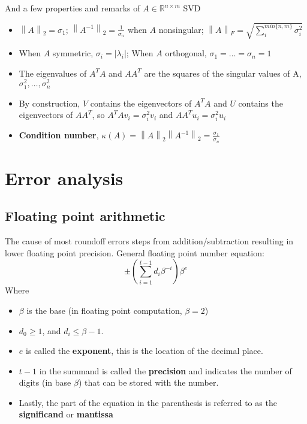 \documentclass{article}
\newcommand{\norm}[2]{\left\lVert#1\right\rVert_#2}
\newcommand{\abs}[1]{\lvert#1\rvert}
\begin{document}
And a few properties and remarks of $A \in \mathbb{R}^{n\times m}$ SVD
\begin{itemize}
    \item $\norm{A}{2} = \sigma_1$; $\norm{A^{-1}}{2} = \frac{1}{\sigma_n}$ when $A$ nonsingular; $\norm{A}{F} = \sqrt{\sum_i^{min\{n,m\}}\sigma_i^2}$
    \item When $A$ symmetric, $\sigma_i = \abs{\lambda_i}$; When $A$ orthogonal, $\sigma_1 = \dots = \sigma_n = 1$
    \item The eigenvalues of $A^TA$ and $AA^T$ are the squares of the singular values of A, $\sigma_1^2, \dots, \sigma_n^2$
    \item By construction, $V$ contains the eigenvectors of $A^TA$ and $U$ contains the eigenvectors of $AA^T$, so $A^TAv_i = \sigma_i^2v_i$ and $AA^Tu_i = \sigma_i^2u_i$
    \item \textbf{Condition number}, $\kappa(A) = \norm{A}{2}\norm{A^{-1}}{2} = \frac{\sigma_1}{\sigma_n}$
\end{itemize}

\section{Error analysis}
\subsection{Floating point arithmetic}
The cause of most roundoff errors steps from addition/subtraction resulting in lower floating point precision. General floating point number equation:
\begin{equation*}
    \pm (\sum_{i=1}^{t-1} d_i\beta^{-i})\beta^e
\end{equation*}
Where 
\begin{itemize}
    \item$\beta$ is the base (in floating point computation, $\beta=2$)
    \item $d_0\geq1$, and $d_i\leq \beta - 1$. 
    \item $e$ is called the \textbf{exponent}, this is the location of the decimal place. 
    \item $t-1$ in the summand is called the \textbf{precision} and indicates the number of digits (in base $\beta$) that can be stored with the number. 
    \item Lastly, the part of the equation in the parenthesis is referred to as the \textbf{significand} or \textbf{mantissa}
\end{itemize}
\end{document}
